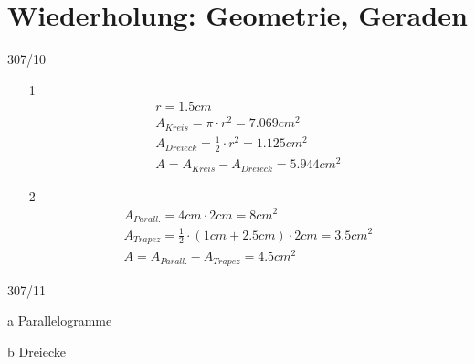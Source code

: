 \section{Wiederholung: Geometrie, Geraden}
\begin{exercise}{307/10}
  \begin{itemize}
    \item [1]
    \begin{gather*}
      r = 1.5cm \\
      A_{Kreis} = \pi \cdot r^2 = 7.069cm^2 \\
      A_{Dreieck} = \frac{1}{2} \cdot r^2 = 1.125cm^2 \\
      A = A_{Kreis} - A_{Dreieck} = 5.944cm^2
    \end{gather*}
    \item [2]
    \begin{gather*}
      A_{Parall.} = 4cm \cdot 2cm = 8cm^2 \\
      A_{Trapez} = \frac{1}{2} \cdot (1cm + 2.5cm) \cdot 2cm = 3.5cm^2 \\
      A = A_{Parall.} - A_{Trapez} = 4.5cm^2
    \end{gather*}
  \end{itemize}
\end{exercise}
\begin{exercise}{307/11}
  \item [a] Parallelogramme
  \item [b] Dreiecke
\end{exercise}
\newpage
